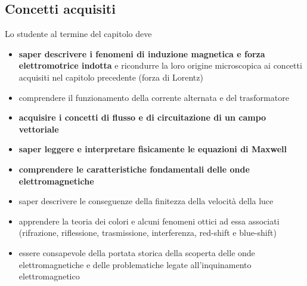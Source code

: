 \documentclass[11pt]{report}
\begin{document}
\subsection*{Concetti acquisiti}
Lo studente al termine del capitolo deve
\begin{itemize}
    \item \textbf{saper descrivere i fenomeni di induzione magnetica e forza elettromotrice indotta} e ricondurre la loro origine microscopica ai concetti acquisiti nel capitolo precedente (forza di Lorentz)
    \item comprendere il funzionamento della corrente alternata e del trasformatore
    \item \textbf{acquisire i concetti di flusso e di circuitazione di un campo vettoriale}
    \item \textbf{saper leggere e interpretare fisicamente le equazioni di Maxwell}
    \item \textbf{comprendere le caratteristiche fondamentali delle onde elettromagnetiche}
    \item saper descrivere le conseguenze della finitezza della velocità della luce
    \item apprendere la teoria dei colori e alcuni fenomeni ottici ad essa associati (rifrazione, riflessione, trasmissione, interferenza, red-shift e blue-shift)
    \item essere consapevole della portata storica della scoperta delle onde elettromagnetiche e delle problematiche legate all'inquinamento elettromagnetico
\end{itemize}
\end{document}
